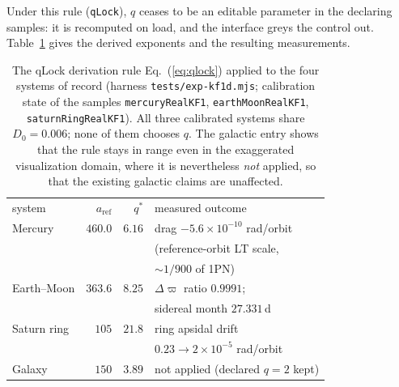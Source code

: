 \documentclass[aps,reprint,amsmath,amssymb,nofootinbib,superscriptaddress,floatfix]{revtex4-2}
\begin{document}
Under this rule (\texttt{qLock}), $q$ ceases to be an editable
parameter in the declaring samples: it is recomputed on load, and the
interface greys the control out.
Table~\ref{tab:qlock} gives the derived exponents and the resulting
measurements.

\begin{table}[t]
\caption{The qLock derivation rule Eq.~(\ref{eq:qlock}) applied to the
  four systems of record (harness \texttt{tests/exp-kf1d.mjs};
  calibration state of the samples \texttt{mercuryRealKF1},
  \texttt{earthMoonRealKF1}, \texttt{saturnRingRealKF1}). All three
  calibrated systems share $D_0=0.006$; none of them chooses $q$.
  The galactic entry shows that the rule stays in range even in the
  exaggerated visualization domain, where it is nevertheless \emph{not}
  applied, so that the existing galactic claims are unaffected.}
\label{tab:qlock}
\begin{ruledtabular}
\begin{tabular}{lrrl}
system & $a_{\mathrm{ref}}$ & $q^{*}$ & measured outcome \\
\colrule
Mercury & $460.0$ & $6.16$ & drag $-5.6{\times}10^{-10}$ rad/orbit \\
 & & & (reference-orbit LT scale, \\
 & & & ${\sim}1/900$ of 1PN) \\
Earth--Moon & $363.6$ & $8.25$ & $\Delta\varpi$ ratio $0.9991$; \\
 & & & sidereal month $27.331$\,d \\
Saturn ring & $105$ & $21.8$ & ring apsidal drift \\
 & & & $0.23\to2{\times}10^{-5}$ rad/orbit \\
Galaxy & $150$ & $3.89$ & not applied (declared $q=2$ kept) \\
\end{tabular}
\end{ruledtabular}
\end{table}
\end{document}
